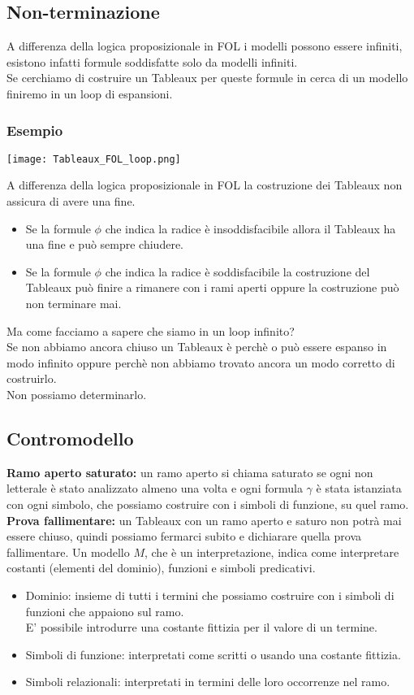 \documentclass[../main.tex]{subfiles}
\begin{document}
   \subsection{Non-terminazione}
   A differenza della logica proposizionale in FOL i modelli possono essere infiniti, esistono infatti formule soddisfatte solo da modelli infiniti.\\
   Se cerchiamo di costruire un Tableaux per queste formule in cerca di un modello finiremo in un loop di espansioni.

   \subsubsection{Esempio}
   \begin{center}
      \texttt{[image: Tableaux\_FOL\_loop.png]}
   \end{center}
   A differenza della logica proposizionale in FOL la costruzione dei Tableaux non assicura di avere una fine.
   \begin{itemize}
      \item Se la formule $\phi$ che indica la radice è insoddisfacibile allora il Tableaux ha una fine e può sempre chiudere.
      \item Se la formule $\phi$ che indica la radice è soddisfacibile la costruzione del Tableaux può finire a rimanere con i rami aperti oppure la costruzione può non terminare mai.
   \end{itemize}
   Ma come facciamo a sapere che siamo in un loop infinito?\\
   Se non abbiamo ancora chiuso un Tableaux è perchè o può essere espanso in modo infinito oppure perchè non abbiamo trovato ancora un modo corretto di costruirlo.\\
   Non possiamo determinarlo.

   \subsection{Contromodello}
   \textbf{Ramo aperto saturato:} un ramo aperto si chiama saturato se ogni non letterale è stato analizzato almeno una volta e ogni formula $\gamma$ è stata istanziata con ogni simbolo, che possiamo costruire con i simboli di funzione, su quel ramo.
   \spazio
   \textbf{Prova fallimentare:} un Tableaux con un ramo aperto e saturo non potrà mai essere chiuso, quindi possiamo fermarci subito e dichiarare quella prova fallimentare.
   \spazio
   Un modello $M$, che è un interpretazione, indica come interpretare costanti (elementi del dominio), funzioni e simboli predicativi.
   \begin{itemize}
      \item Dominio: insieme di tutti i termini che possiamo costruire con i simboli di funzioni che appaiono sul ramo.\\
         E' possibile introdurre una costante fittizia per il valore di un termine.
      \item Simboli di funzione: interpretati come scritti o usando una costante fittizia.
      \item Simboli relazionali: interpretati in termini delle loro occorrenze nel ramo.
   \end{itemize}
\end{document}
